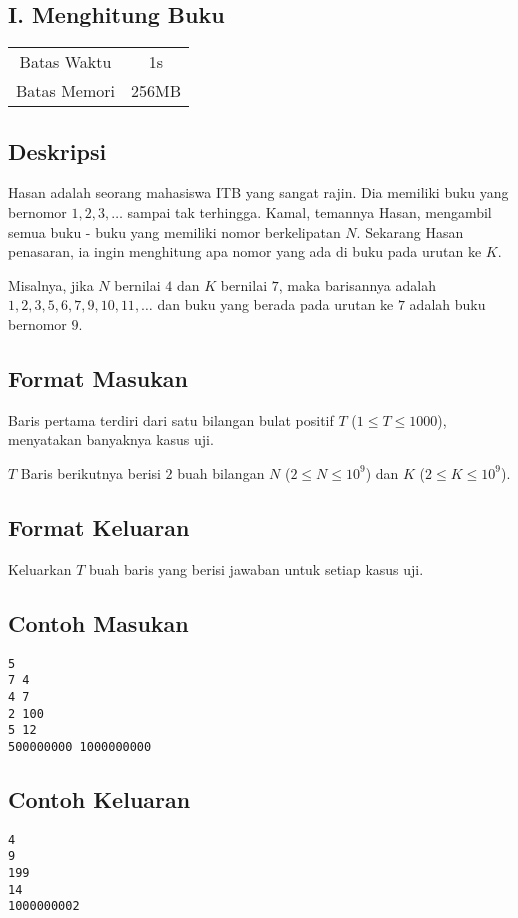 \documentclass{article}
\begin{document}
\begin{center}
    \section*{I. Menghitung Buku}

    \begin{tabular}{ | c c | }
        \hline
        Batas Waktu  & 1s \\    %
        Batas Memori & 256MB \\  %
        \hline
    \end{tabular}
\end{center}

\subsection*{Deskripsi}

Hasan adalah seorang mahasiswa ITB yang sangat rajin. Dia memiliki buku yang bernomor $1, 2, 3, \dots$ sampai tak terhingga. Kamal, temannya Hasan, mengambil semua buku - buku yang memiliki nomor berkelipatan $N$. Sekarang Hasan penasaran, ia ingin menghitung apa nomor yang ada di buku pada urutan ke $K$.

Misalnya, jika $N$ bernilai $4$ dan $K$ bernilai $7$, maka barisannya adalah $1, 2, 3, 5, 6, 7, 9, 10, 11, \dots$ dan buku yang berada pada urutan ke $7$ adalah buku bernomor $9$.

\subsection*{Format Masukan}

Baris pertama terdiri dari satu bilangan bulat positif $T$ ($1 \leq T \leq 1000$), menyatakan banyaknya kasus uji.

$T$ Baris berikutnya berisi $2$ buah bilangan $N$ ($2 \leq N \leq 10^9$) dan $K$ ($2 \leq K \leq 10^9$).

\subsection*{Format Keluaran}

Keluarkan $T$ buah baris yang berisi jawaban untuk setiap kasus uji.
\\

\begin{multicols}{2}
\subsection*{Contoh Masukan}
\begin{lstlisting}
5
7 4
4 7
2 100
5 12
500000000 1000000000
\end{lstlisting}
\columnbreak
\subsection*{Contoh Keluaran}
\begin{lstlisting}
4
9
199
14
1000000002
\end{lstlisting}
\vfill
\null
\end{multicols}
\end{document}
